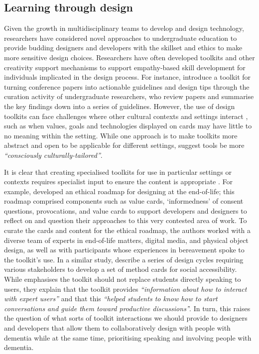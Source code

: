 \subsection{Learning through design}
\label{Dementia-Design}
Given the growth in multidisciplinary teams to develop and design technology, researchers have considered novel approaches to undergraduate education to provide budding designers and developers with the skillset and ethics to make more sensitive design choices. Researchers have often developed toolkits and other creativity support mechanisms to support empathy-based skill development for individuals implicated in the design process. For instance, \cite{chen2020interaction} introduce a toolkit for turning conference papers into actionable guidelines and design tips through the curation activity of undergraduate researchers, who review papers and summarise the key findings down into a series of guidelines. However, the use of design toolkits can face challenges where other cultural contexts and settings interact \citep{peters2020toolkits}, such as when values, goals and technologies displayed on cards may have little to no meaning within the setting. While one approach is to make toolkits more abstract and open to be applicable for different settings, \cite{peters2020toolkits} suggest tools be more \textit{``consciously culturally-tailored''}.  

It is clear that creating specialised toolkits for use in particular settings or contexts requires specialist input to ensure the content is appropriate \citep{alshehri2020scenario,meissner2018schnittmuster}. For example, \cite{craig2021development} developed an ethical roadmap for designing at the end-of-life; this roadmap comprised components such as value cards, ‘informedness’ of consent questions, provocations, and value cards to support developers and designers to reflect on and question their approaches to this very contested area of work. To curate the cards and content for the ethical roadmap, the authors worked with a diverse team of experts in end-of-life matters, digital media, and physical object design, as well as with participants whose experiences in bereavement spoke to the toolkit’s use. In a similar study, \cite{shinohara2020design} describe a series of design cycles requiring various stakeholders to develop a set of method cards for social accessibility. While \cite{shinohara2020design} emphasises the toolkit should not replace students directly speaking to users, they explain that the toolkit provides \textit{``information about how to interact with expert users''} and that this \textit{``helped students to know how to start conversations and guide them toward productive discussions'}'. In turn, this raises the question of what sorts of toolkit interactions we should provide to designers and developers that allow them to collaboratively design with people with dementia while at the same time, prioritising speaking and involving people with dementia.

